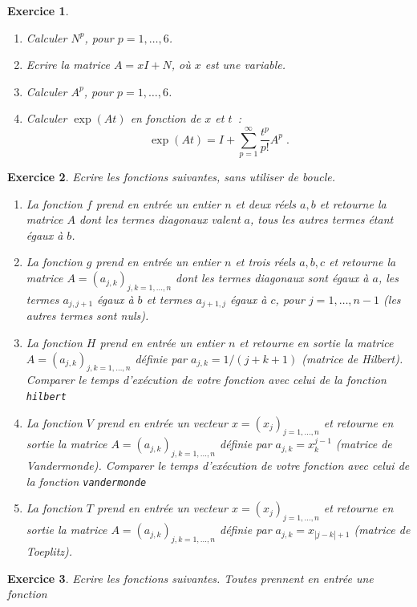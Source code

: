 \documentclass{article}
\newtheorem{exo}{Exercice}[section]
\begin{document}
\begin{giacjshere}
\begin{exo}
{\begin{enumerate}
$n_{j,k}=0$ si $k \neq j+1$. 
\item
Calculer $N^p$, pour $p=1,\ldots,6$. 
\item
Ecrire la matrice $A=xI+N$, o\`u $x$ est une variable.
\item
Calculer $A^p$, pour $p=1,\ldots,6$. 
\item 
Calculer $\exp(At)$ en fonction de $x$ et $t$~:
$$
\exp(At) = I+\sum_{p=1}^\infty \frac{t^p}{p!} A^p\;.
$$
\end{enumerate} 
}\end{exo}
\begin{exo}{\rm 
Ecrire les fonctions suivantes, sans utiliser de boucle.
\begin{enumerate}
\item
La fonction $f$ prend en entr\'ee un entier $n$ 
et deux r\'eels $a, b$ et retourne
la matrice $A$ dont les termes diagonaux valent $a$, tous les autres
termes \'etant \'egaux \`a $b$.   
\item
La fonction $g$ prend en entr\'ee un entier $n$ et trois r\'eels $a,
b, c$ et retourne
la matrice $A=(a_{j,k})_{j,k=1,\ldots,n}$ dont les termes diagonaux
sont \'egaux \`a $a$, les termes $a_{j,j+1}$ \'egaux  \`a $b$ et  
termes $a_{j+1,j}$ \'egaux \`a $c$, pour $j=1,\ldots,n-1$ (les autres
termes sont nuls).  
\item
La fonction $H$ prend en entr\'ee un entier $n$ et retourne en sortie 
la matrice  $A=(a_{j,k})_{j,k=1,\ldots,n}$
d\'efinie par $a_{j,k} = 1/(j+k+1)$ (matrice de Hilbert).
Comparer le temps d'ex\'ecution de votre fonction avec celui de
la fonction \verb|hilbert|
\item
La fonction $V$ prend en entr\'ee un vecteur $x=(x_j)_{j=1,\ldots,n}$
et retourne en sortie la matrice $A=(a_{j,k})_{j,k=1,\ldots,n}$
d\'efinie par $a_{j,k} = x_k^{j-1}$ (matrice de Vandermonde).
Comparer le temps d'ex\'ecution de votre fonction avec celui de
la fonction \verb|vandermonde|
\item
La fonction $T$ prend en entr\'ee un vecteur $x=(x_j)_{j=1,\ldots,n}$
et retourne en sortie la matrice $A=(a_{j,k})_{j,k=1,\ldots,n}$
d\'efinie par $a_{j,k} = x_{|j-k|+1}$ (matrice de Toeplitz).
\end{enumerate}
}\end{exo}
\begin{exo}{\rm
Ecrire les fonctions suivantes. Toutes prennent en entr\'ee une fonction 
}
\end{exo}
\end{giacjshere}
\end{document}
